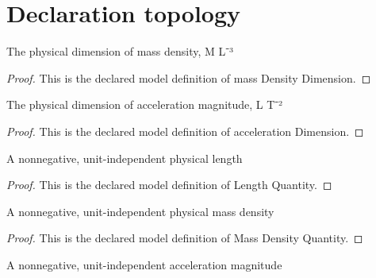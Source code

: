 \section{Declaration topology}
\begin{definition}
  \label{def:physics:phyx-mini-0721:phyxminiproblems-problemphyxmini0721-massdensitydimension}
  The physical dimension of mass density, M L⁻³
\end{definition}
\begin{proof}
  This is the declared model definition of mass Density Dimension.
\end{proof}
\begin{definition}
  \label{def:physics:phyx-mini-0721:phyxminiproblems-problemphyxmini0721-accelerationdimension}
  The physical dimension of acceleration magnitude, L T⁻²
\end{definition}
\begin{proof}
  This is the declared model definition of acceleration Dimension.
\end{proof}
\begin{definition}
  \label{def:physics:phyx-mini-0721:phyxminiproblems-problemphyxmini0721-lengthquantity}
  A nonnegative, unit-independent physical length
\end{definition}
\begin{proof}
  This is the declared model definition of Length Quantity.
\end{proof}
\begin{definition}
  \label{def:physics:phyx-mini-0721:phyxminiproblems-problemphyxmini0721-massdensityquantity}
  A nonnegative, unit-independent physical mass density
\end{definition}
\begin{proof}
  This is the declared model definition of Mass Density Quantity.
\end{proof}
\begin{definition}
  \label{def:physics:phyx-mini-0721:phyxminiproblems-problemphyxmini0721-accelerationquantity}
  A nonnegative, unit-independent acceleration magnitude
\end{definition}
